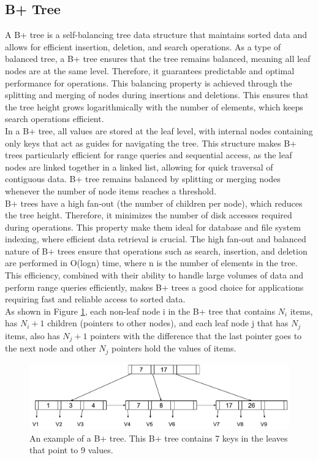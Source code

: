 \documentclass[11pt]{ucthesis}
\begin{document}
\subsection{B+ Tree}
A B+ tree \cite{comer1979ubiquitous, knuth1997art} is a self-balancing tree data structure that maintains sorted data and allows for efficient insertion, deletion, and search operations. As a type of balanced tree, a B+ tree ensures that the tree remains balanced, meaning all leaf nodes are at the same level. Therefore, it guarantees predictable and optimal performance for operations. This balancing property is achieved through the splitting and merging of nodes during insertions and deletions. This ensures that the tree height grows logarithmically with the number of elements, which keeps search operations efficient.\\
In a B+ tree, all values are stored at the leaf level, with internal nodes containing only keys that act as guides for navigating the tree. This structure makes B+ trees particularly efficient for range queries and sequential access, as the leaf nodes are linked together in a linked list, allowing for quick traversal of contiguous data. B+ tree remains balanced by splitting or merging nodes whenever the number of node items reaches a threshold. \\
B+ trees have a high fan-out (the number of children per node), which reduces the tree height. Therefore, it minimizes the number of disk accesses required during operations. This property make them ideal for database and file system indexing, where efficient data retrieval is crucial. The high fan-out and balanced nature of B+ trees ensure that operations such as search, insertion, and deletion are performed in O(log⁡n) time, where n is the number of elements in the tree. This efficiency, combined with their ability to handle large volumes of data and perform range queries efficiently, makes B+ trees a good choice for applications requiring fast and reliable access to sorted data.\\
As shown in Figure \ref{fig:2:4}, each non-leaf node i in the B+ tree that contains $N_i$ items, has $N_{i} + 1$ children (pointers to other nodes), and each leaf node j that has $N_j$ items, also has $N_{j} + 1$ pointers with the difference that the last pointer goes to the next node and other $N_j$ pointers hold the values of items. 

\begin{figure}[h]
    \centering
    \includegraphics[width=\linewidth]{Images/B+ Tree Normal.pdf}
    \caption[B+ tree illustration]{An example of a B+ tree. This B+ tree contains 7 keys in the leaves that point to 9 values. }
    \label{fig:2:4}
\end{figure}
\end{document}
